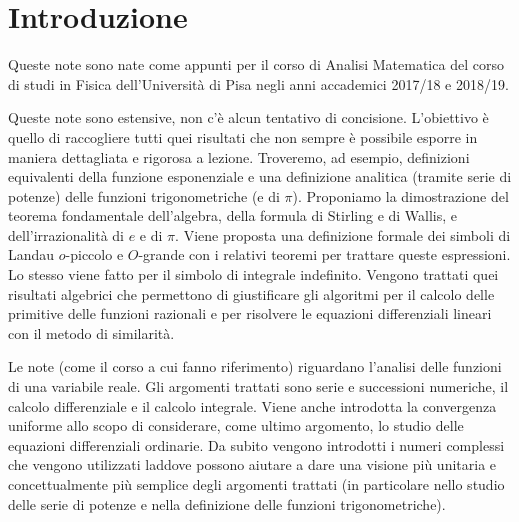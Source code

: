 \chapter*{Introduzione}


Queste note sono nate come appunti per il corso di Analisi Matematica %
del corso di studi in Fisica dell'Università %
di Pisa negli anni accademici 2017/18 e 2018/19. %

Queste note sono estensive, non c'è alcun tentativo di concisione. %
L'obiettivo è quello di raccogliere tutti quei risultati che non sempre è %
possibile esporre in maniera dettagliata e rigorosa a lezione. %
Troveremo, ad esempio, %
definizioni equivalenti della funzione esponenziale e una definizione %
analitica (tramite serie di potenze) %
delle funzioni trigonometriche (e di $\pi$). %
Proponiamo la dimostrazione del teorema fondamentale dell'algebra, %
della formula di Stirling e di Wallis, %
e dell'irrazionalità di $e$ e di $\pi$. %
Viene proposta una definizione formale dei simboli di Landau %
$o$-piccolo e $O$-grande con i relativi teoremi per trattare queste espressioni. %
Lo stesso viene fatto per il simbolo di integrale indefinito. %
Vengono trattati quei risultati algebrici che permettono di %
giustificare gli algoritmi per il calcolo delle primitive %
delle funzioni razionali e per risolvere le equazioni differenziali %
lineari con il metodo di similarità. %

Le note (come il corso a cui fanno riferimento) %
riguardano l'analisi delle funzioni di una variabile %
reale. %
Gli argomenti trattati sono serie e successioni numeriche, %
il calcolo differenziale e il calcolo integrale. %
Viene anche introdotta la convergenza uniforme allo scopo di considerare, %
come ultimo argomento, lo studio delle equazioni differenziali ordinarie. %
Da subito vengono introdotti i numeri complessi che vengono utilizzati %
laddove possono aiutare a dare una visione più unitaria e concettualmente %
più semplice degli argomenti trattati (in particolare nello studio delle serie %
di potenze e nella definizione delle funzioni trigonometriche). %


